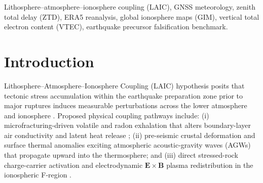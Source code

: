 ﻿\documentclass[journal]{IEEEtran}
\begin{document}
\begin{IEEEkeywords}
Lithosphere--atmosphere--ionosphere coupling (LAIC), GNSS meteorology, zenith total delay (ZTD), ERA5 reanalysis, global ionosphere maps (GIM), vertical total electron content (VTEC), earthquake precursor falsification benchmark.
\end{IEEEkeywords}

\section{Introduction}
 Lithosphere--Atmosphere--Ionosphere Coupling (LAIC) hypothesis posits that tectonic stress accumulation within the earthquake preparation zone prior to major ruptures induces measurable perturbations across the lower atmosphere and ionosphere \cite{dobrovolsky1979,pulinets2011}. Proposed physical coupling pathways include: (i) microfracturing-driven volatile and radon exhalation that alters boundary-layer air conductivity and latent heat release \cite{pulinets2011}; (ii) pre-seismic crustal deformation and surface thermal anomalies exciting atmospheric acoustic-gravity waves (AGWs) that propagate upward into the thermosphere; and (iii) direct stressed-rock charge-carrier activation and electrodynamic $\mathbf{E} \times \mathbf{B}$ plasma redistribution in the ionospheric F-region \cite{heki2011,he2017}.
\end{document}
